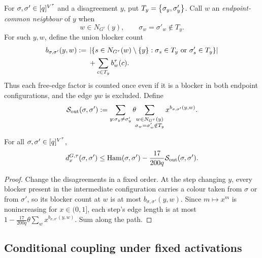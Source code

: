 For \(\sigma,\sigma'\in[q]^{V^\tau}\) and a disagreement \(y\), put
\(T_y=\left\{\sigma_y,\sigma'_y\right\}\).  Call \(w\) an
\emph{endpoint-common neighbour} of \(y\) when
\[
 w\in N_{G^\tau}(y),\qquad \sigma_w=\sigma'_w\notin T_y.
\]
For such \(y,w\), define the union blocker count
\[
\begin{aligned}
b_{\sigma,\sigma'}(y,w)
 :={}&\left|\left\{s\in N_{G^\tau}(w)\setminus\left\{y\right\}:
          \sigma_s\in T_y\ \text{or}\ \sigma'_s\in T_y\right\}\right|\\
 &+\sum_{c\in T_y}b_w^\tau(c).
\end{aligned}
\]
Thus each free-edge factor is counted once even if it is a blocker in
both endpoint configurations, and the edge \(yw\) is excluded.  Define
\begin{equation}\label{eq:cv-output-score}
 \mathcal S_{\rm out}(\sigma,\sigma')
 :=\sum_{y:\sigma_y\ne\sigma'_y}
      \theta\!\!\sum_{\substack{w\in N_{G^\tau}(y)\\
                 \sigma_w=\sigma'_w\notin T_y}}
        x^{b_{\sigma,\sigma'}(y,w)} .
\end{equation}

\begin{lemma}\label{lem:cv-path}
For all \(\sigma,\sigma'\in[q]^{V^\tau}\),
\begin{equation}\label{eq:cv-path}
  d_x^{G,\tau}(\sigma,\sigma')\le\operatorname{Ham}(\sigma,\sigma')
   -\frac{17}{200q}\mathcal S_{\rm out}(\sigma,\sigma').
\end{equation}
\end{lemma}

\begin{proof}
Change the disagreements in a fixed order. At the step changing $y$, every
blocker present in the intermediate configuration carries a colour taken
from $\sigma$ or from $\sigma'$, so its blocker count at $w$ is at most
$b_{\sigma,\sigma'}(y,w)$.  Since $m\mapsto x^m$ is nonincreasing for
$x\in(0,1]$, each step's edge length is at most
$1-\tfrac{17}{200q}\theta\sum_wx^{b_{\sigma,\sigma'}(y,w)}$. Sum along the
path.
\end{proof}

\subsection{Conditional coupling under fixed activations}


